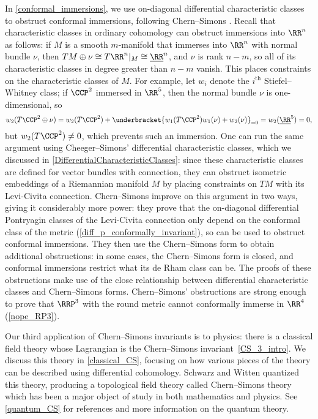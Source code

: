 In \cref{conformal_immersions}, we use on-diagonal differential characteristic classes to obstruct conformal
immersions, following Chern--Simons \cite{cs}. Recall that characteristic classes in ordinary cohomology can
obstruct immersions into $\RR^n$ as follows: if $M$ is a smooth $m$-manifold that immerses into $\RR^n$ with normal
bundle $\nu$, then $TM\oplus\nu \cong T\RR^n|_M\cong\underline\RR^n$, and $\nu$ is rank $n-m$, so all of its
characteristic classes in degree greater than $n-m$ vanish. This places constraints on the characteristic classes
of $M$. For example, let $w_i$ denote the $i^{\mathrm{th}}$ Stiefel--Whitney
class; if $\CCP^2$ immersed in $\RR^5$, then the normal bundle $\nu$ is
one-dimensional, so
\begin{equation}
	w_2(T\CCP^2\oplus\nu) = w_2(T\CCP^2) + \underbracket{w_1(T\CCP^2)w_1(\nu) + w_2(\nu)}_{=0} =
	w_2(\underline\RR^5) = 0,
\end{equation}
but $w_2(T\CCP^2)\ne 0$, which prevents such an immersion. One can run the same argument using Cheeger--Simons'
differential characteristic classes, which we discussed in \cref{DifferentialCharacteristicClasses}: since these
characteristic classes are defined for vector bundles with connection, they can obstruct isometric embeddings of a
Riemannian manifold $M$ by placing constraints on $TM$ with its Levi-Civita
connection. Chern--Simons \cite{cs} improve on this argument in two
ways, giving it considerably more power: they prove that the on-diagonal differential Pontryagin classes of the
Levi-Civita connection only depend on the conformal class of the metric (\cref{diff_p_conformally_invariant}), so
can be used to obstruct conformal immersions. They then use the Chern--Simons form to obtain additional
obstructions: in some cases, the Chern--Simons form is closed, and conformal immersions restrict what its de Rham
class can be. The proofs of these obstructions make use of the close relationship between differential
characteristic classes and Chern--Simons forms. Chern--Simons' obstructions are strong enough to prove that
$\RRP^3$ with the round metric cannot conformally immerse in $\RR^4$ (\cref{nope_RP3}).

Our third application of Chern--Simons invariants is to physics: there is a classical field theory whose Lagrangian
is the Chern--Simons invariant~\eqref{CS_3_intro}. We discuss this theory in \cref{classical_CS}, focusing on how
various pieces of the theory can be described using differential cohomology. Schwarz \cite{Sch77} and
Witten \cite{Wit89} quantized this theory, producing a topological field theory called Chern--Simons
theory which has been a major object of study in both mathematics and
physics. See \cref{quantum_CS} for references and more information on the quantum theory.

